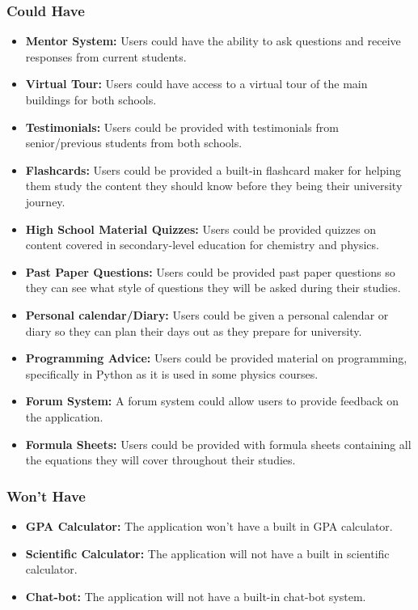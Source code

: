 \documentclass{l4proj}
\begin{document}
\subsubsection{Could Have}
\begin{itemize}
    \item \textbf{Mentor System:} Users could have the ability to ask questions and receive responses from current students.
    \item \textbf{Virtual Tour:} Users could have access to a virtual tour of the main buildings for both schools.
    \item \textbf{Testimonials:} Users could be provided with testimonials from senior/previous students from both schools.
    \item \textbf{Flashcards:} Users could be provided a built-in flashcard maker for helping them study the content they should know before they being their university journey.
    \item \textbf{High School Material Quizzes:} Users could be provided quizzes on content covered in secondary-level education for chemistry and physics.
    \item \textbf{Past Paper Questions:} Users could be provided past paper questions so they can see what style of questions they will be asked during their studies.
    \item \textbf{Personal calendar/Diary:} Users could be given a personal calendar or diary so they can plan their days out as they prepare for university.
    \item\textbf{Programming Advice:} Users could be provided material on programming,  specifically in Python as it is used in some physics courses.
    \item \textbf{Forum System:} A forum system could allow users to provide feedback on the application.
    \item \textbf{Formula Sheets:} Users could be provided with formula sheets containing all the equations they will cover throughout their studies.
\end{itemize}

\subsubsection{Won't Have}
\begin{itemize}
    \item \textbf{GPA Calculator:} The application won't have a built in GPA calculator.
    \item \textbf{Scientific Calculator:} The application will not have a built in scientific calculator.
    \item \textbf{Chat-bot:} The application will not have a built-in chat-bot system.
\end{itemize}
\end{document}
